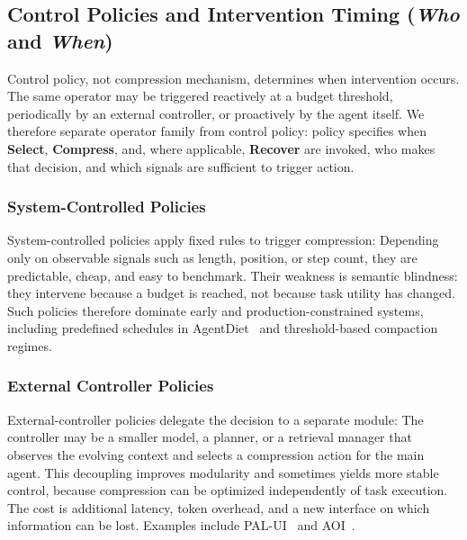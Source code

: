 \subsection{Control Policies and Intervention Timing (\textit{Who} and \textit{When})}
\label{subsec:compression_policy}

Control policy, not compression mechanism, determines when intervention occurs. The same operator may be triggered reactively at a budget threshold, periodically by an external controller, or proactively by the agent itself. We therefore separate operator family from control policy: policy specifies when \textbf{Select}, \textbf{Compress}, and, where applicable, \textbf{Recover} are invoked, who makes that decision, and which signals are sufficient to trigger action.


\subsubsection{System-Controlled Policies} 
System-controlled policies apply fixed rules to trigger compression:
Depending only on observable signals such as length, position, or step count, they are predictable, cheap, and easy to benchmark. Their weakness is semantic blindness: they intervene because a budget is reached, not because task utility has changed. Such policies therefore dominate early and production-constrained systems, including predefined schedules in AgentDiet~\citep{xiao2025improving} and threshold-based compaction regimes.

\subsubsection{External Controller Policies} 
External-controller policies delegate the decision to a separate module:
The controller may be a smaller model, a planner, or a retrieval manager that observes the evolving context and selects a compression action for the main agent. This decoupling improves modularity and sometimes yields more stable control, because compression can be optimized independently of task execution. The cost is additional latency, token overhead, and a new interface on which information can be lost. Examples include PAL-UI~\citep{liu2025paluiplanningactivelookback} and AOI~\citep{bai2026aoicontextawaremultiagentoperations}.

